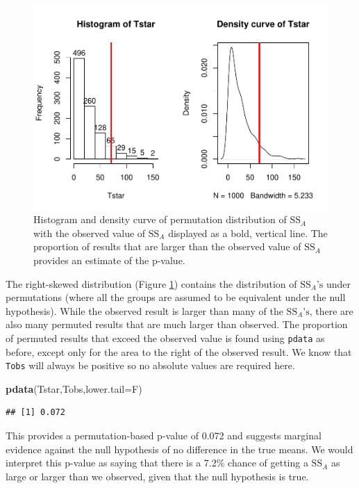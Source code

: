 \documentclass[]{book}
\newenvironment{Shaded}{\begin{snugshade}}{\end{snugshade}}
\newcommand{\KeywordTok}[1]{\textcolor[rgb]{0.13,0.29,0.53}{\textbf{#1}}}
\newcommand{\DataTypeTok}[1]{\textcolor[rgb]{0.13,0.29,0.53}{#1}}
\newcommand{\NormalTok}[1]{#1}
\theoremstyle{definition}
\theoremstyle{definition}
\theoremstyle{remark}
\begin{document}
\begin{figure}
\centering
\includegraphics{03-oneWayAnova_files/figure-latex/Figure3-5-1.pdf}
\caption{\label{fig:Figure3-5}Histogram and density curve of permutation distribution of
\(\text{SS}_A\) with the observed value of \(\text{SS}_A\) displayed as
a bold, vertical line. The proportion of results that are larger than
the observed value of \(\text{SS}_A\) provides an estimate of the
p-value.}
\end{figure}

The right-skewed distribution (Figure \ref{fig:Figure3-5}) contains the
distribution of \(\text{SS}_A\text{'s}\) under permutations (where all
the groups are assumed to be equivalent under the null hypothesis).
While the observed result is larger than many of the
\(\text{SS}_A\text{'s}\), there are also many permuted results that are
much larger than observed. The proportion of permuted results that
exceed the observed value is found using \texttt{pdata} as before,
except only for the area to the right of the observed result. We know
that \texttt{Tobs} will always be positive so no absolute values are
required here.

\begin{Shaded}
\begin{Highlighting}[]
\KeywordTok{pdata}\NormalTok{(Tstar,Tobs,}\DataTypeTok{lower.tail=}\NormalTok{F)}
\end{Highlighting}
\end{Shaded}

\begin{verbatim}
## [1] 0.072
\end{verbatim}

This provides a permutation-based p-value of 0.072 and suggests marginal
evidence against the null hypothesis of no difference in the true means.
We would interpret this p-value as saying that there is a 7.2\% chance
of getting a \(\text{SS}_A\) as large or larger than we observed, given
that the null hypothesis is true.
\end{document}
